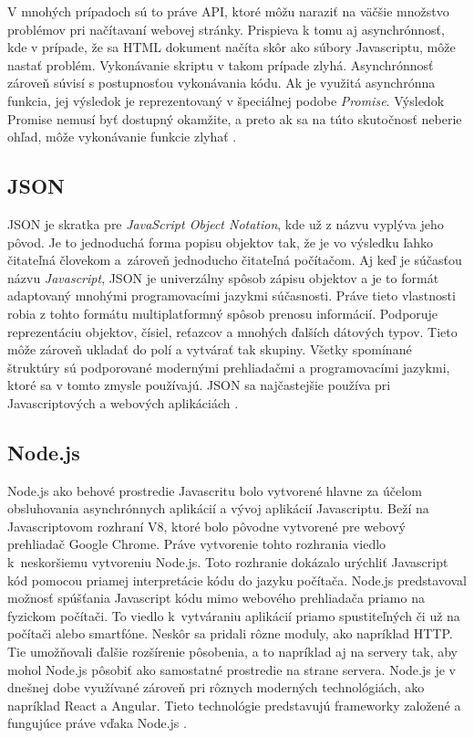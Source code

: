 V mnohých prípadoch sú to práve API, ktoré môžu naraziť na väčšie množstvo problémov pri načítavaní webovej stránky. Prispieva k tomu aj asynchrónnosť, kde v prípade, že sa HTML dokument načíta skôr ako súbory Javascriptu, môže nastať problém. Vykonávanie skriptu v takom prípade zlyhá. Asynchrónnosť zároveň súvisí s postupnosťou vykonávania kódu. Ak je využitá asynchrónna funkcia, jej výsledok je reprezentovaný v špeciálnej podobe \textit{Promise}. Výsledok Promise nemusí byť dostupný okamžite, a preto ak sa na túto skutočnosť neberie ohľad, môže vykonávanie funkcie zlyhať \cite{Javascript}.

\newpage
\subsection{JSON}

JSON je skratka pre \textit{JavaScript Object Notation}, kde už z názvu vyplýva jeho pôvod. Je to jednoduchá forma popisu objektov tak, že je vo výsledku ľahko čitateľná človekom a~zároveň jednoducho čitateľná počítačom. Aj keď je súčasťou názvu \textit{Javascript}, JSON je univerzálny spôsob zápisu objektov a je to formát adaptovaný mnohými programovacími jazykmi súčasnosti. Práve tieto vlastnosti robia z tohto formátu multiplatformný spôsob prenosu informácií. Podporuje reprezentáciu objektov, čísiel, reťazcov a mnohých ďalších dátových typov. Tieto môže zároveň ukladať do polí a vytvárať tak skupiny. Všetky spomínané štruktúry sú podporované modernými prehliadačmi a programovacími jazykmi, ktoré sa v tomto zmysle používajú. JSON sa najčastejšie používa pri Javascriptových a webových aplikáciách \cite{JSON}.

\subsection{Node.js}

Node.js ako behové prostredie Javascritu bolo vytvorené hlavne za účelom obsluhovania asynchrónnych aplikácií a vývoj aplikácií Javascriptu. Beží na Javascriptovom rozhraní V8, ktoré bolo pôvodne vytvorené pre webový prehliadač Google Chrome. Práve vytvorenie tohto rozhrania viedlo k~neskoršiemu vytvoreniu Node.js. Toto rozhranie dokázalo urýchliť Javascript kód pomocou priamej interpretácie kódu do jazyku počítača. Node.js predstavoval možnosť spúšťania Javascript kódu mimo webového prehliadača priamo na fyzickom počítači. To viedlo k~vytváraniu aplikácií priamo spustiteľných či už na počítači alebo smartfóne. Neskôr sa pridali rôzne moduly, ako napríklad HTTP. Tie umožňovali ďalšie rozšírenie pôsobenia, a to napríklad aj na servery tak, aby mohol Node.js pôsobiť ako samostatné prostredie na strane servera. Node.js je v dnešnej dobe využívané zároveň pri rôznych moderných technológiách, ako napríklad React a Angular. Tieto technológie predstavujú frameworky založené a fungujúce práve vďaka Node.js \cite{Node}.

